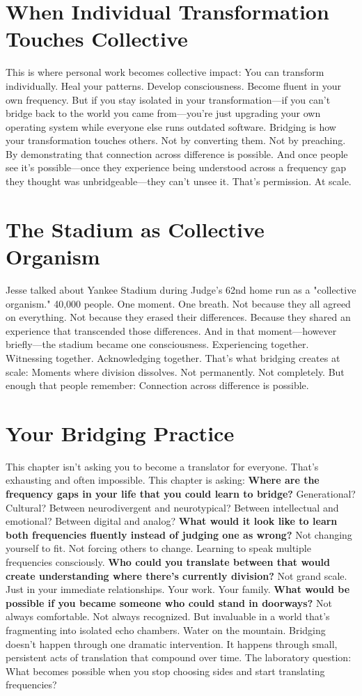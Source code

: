 \documentclass[12pt,openany]{book}
\begin{document}
\section{When Individual Transformation Touches Collective}

This is where personal work becomes collective impact:
You can transform individually. Heal your patterns. Develop consciousness. Become fluent in your own frequency.
But if you stay isolated in your transformation—if you can't bridge back to the world you came from—you're just upgrading your own operating system while everyone else runs outdated software.
Bridging is how your transformation touches others.
Not by converting them. Not by preaching. By demonstrating that connection across difference is possible.
And once people see it's possible—once they experience being understood across a frequency gap they thought was unbridgeable—they can't unsee it.
That's permission. At scale.

\section{The Stadium as Collective Organism}

Jesse talked about Yankee Stadium during Judge's 62nd home run as a "collective organism."
40,000 people. One moment. One breath.
Not because they all agreed on everything. Not because they erased their differences. Because they shared an experience that transcended those differences.
And in that moment—however briefly—the stadium became one consciousness. Experiencing together. Witnessing together. Acknowledging together.
That's what bridging creates at scale:
Moments where division dissolves. Not permanently. Not completely. But enough that people remember: Connection across difference is possible.

\section{Your Bridging Practice}

This chapter isn't asking you to become a translator for everyone. That's exhausting and often impossible.
This chapter is asking:
\textbf{Where are the frequency gaps in your life that you could learn to bridge?}
Generational? Cultural? Between neurodivergent and neurotypical? Between intellectual and emotional? Between digital and analog?
\textbf{What would it look like to learn both frequencies fluently instead of judging one as wrong?}
Not changing yourself to fit. Not forcing others to change. Learning to speak multiple frequencies consciously.
\textbf{Who could you translate between that would create understanding where there's currently division?}
Not grand scale. Just in your immediate relationships. Your work. Your family.
\textbf{What would be possible if you became someone who could stand in doorways?}
Not always comfortable. Not always recognized. But invaluable in a world that's fragmenting into isolated echo chambers.
Water on the mountain.
Bridging doesn't happen through one dramatic intervention. It happens through small, persistent acts of translation that compound over time.
The laboratory question:
What becomes possible when you stop choosing sides and start translating frequencies?
\end{document}
